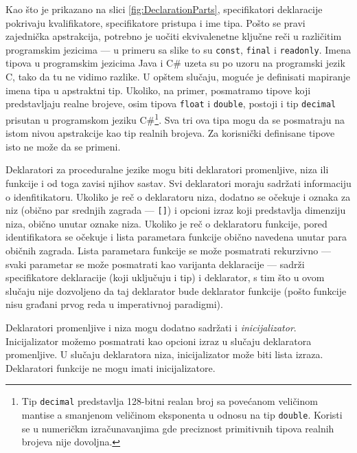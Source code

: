 Kao što je prikazano na slici \ref{fig:DeclarationParts}, specifikatori deklaracije pokrivaju kvalifikatore, specifikatore pristupa i ime tipa. Pošto se pravi zajednička apstrakcija, potrebno je uočiti ekvivalenetne ključne reči u različitim programskim jezicima --- u primeru sa slike to su \texttt{const}, \texttt{final} i \texttt{readonly}. Imena tipova u programskim jezicima Java i C\# uzeta su po uzoru na programski jezik C, tako da tu ne vidimo razlike. U opštem slučaju, moguće je definisati mapiranje imena tipa u apstraktni tip. Ukoliko, na primer, posmatramo tipove koji predstavljaju realne brojeve, osim tipova \texttt{float} i \texttt{double}, postoji i tip \texttt{decimal} prisutan u programskom jeziku C\#\footnote{Tip \texttt{decimal} predstavlja 128-bitni realan broj sa povećanom veličinom mantise a smanjenom veličinom eksponenta u odnosu na tip \texttt{double}. Koristi se u numeričkm izračunavanjima gde preciznost primitivnih tipova realnih brojeva nije dovoljna.}. Sva tri ova tipa mogu da se posmatraju na istom nivou apstrakcije kao tip realnih brojeva. Za korisnički definisane tipove isto ne može da se primeni.

Deklaratori za proceduralne jezike mogu biti deklaratori promenljive, niza ili funkcije i od toga zavisi njihov sastav. Svi deklaratori moraju sadržati informaciju o idenfitikatoru. Ukoliko je reč o deklaratoru niza, dodatno se očekuje i oznaka za niz (obično par srednjih zagrada --- \texttt{[]}) i opcioni izraz koji predstavlja dimenziju niza, obično unutar oznake niza. Ukoliko je reč o deklaratoru funkcije, pored identifikatora se očekuje i lista parametara funkcije obično navedena unutar para običnih zagrada. Lista parametara funkcije se može posmatrati rekurzivno --- svaki parametar se može posmatrati kao varijanta deklaracije --- sadrži specifikatore deklaracije (koji uključuju i tip) i deklarator, s tim što u ovom slučaju nije dozvoljeno da taj deklarator bude deklarator funkcije (pošto funkcije nisu građani prvog reda u imperativnoj paradigmi). 

Deklaratori promenljive i niza mogu dodatno sadržati i \emph{inicijalizator}. Inicijalizator možemo posmatrati kao opcioni izraz u slučaju deklaratora promenljive. U slučaju deklaratora niza, inicijalizator može biti lista izraza. Deklaratori funkcije ne mogu imati inicijalizatore.

